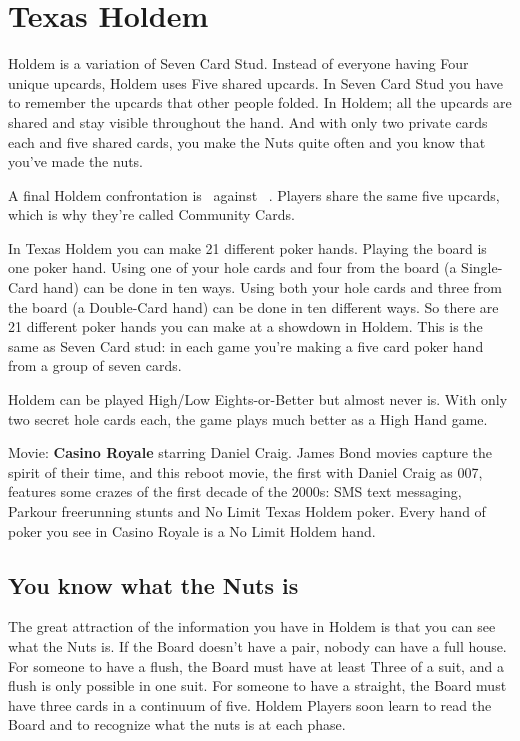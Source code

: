 \section{Texas Holdem}

Holdem is a variation of Seven Card Stud. Instead of everyone
having Four unique upcards, Holdem uses Five shared upcards. In Seven
Card Stud you have to remember the upcards that other people
folded. In Holdem; all the upcards are shared and stay visible
throughout the hand. And with only two private cards each and five
shared cards, you make the Nuts quite often and you know that you've
made the nuts.

A final Holdem confrontation is
\back\back\nines\Qd\Jd\tres\fourc\ against
\back\back\nines\Qd\Jd\tres\fourc\ . Players share the same five
upcards, which is why they're called Community Cards.

In Texas Holdem you can make 21 different poker hands. Playing the
board is one poker hand. Using one of your hole cards and four from the
board (a Single-Card hand) can be done in ten ways. Using both your
hole cards and three from the board (a Double-Card hand) can be done
in ten different ways. So there are 21 different poker hands you can
make at a showdown in Holdem. This is the same as Seven Card
stud: in each game you're making a five card poker hand from a
group of seven cards.

Holdem can be played High/Low Eights-or-Better but almost never
is. With only two secret hole cards each, the game plays much better
as a High Hand game.

Movie: \textbf{Casino Royale} starring Daniel Craig. James Bond movies
capture the spirit of their time, and this reboot movie, the first
with Daniel Craig as 007, features some crazes of the first decade of
the 2000s: SMS text messaging, Parkour freerunning stunts and No Limit
Texas Holdem poker. Every hand of poker you see in Casino Royale is a
No Limit Holdem hand.

\subsection{You know what the Nuts is}

The great attraction of the information you have in Holdem is that you
can see what the Nuts is. If the Board doesn't have a pair, nobody can
have a full house. For someone to have a flush, the Board must have at
least Three of a suit, and a flush is only possible in one suit. For
someone to have a straight, the Board must have three cards in a
continuum of five. Holdem Players soon learn to read the Board and to
recognize what the nuts is at each phase.

